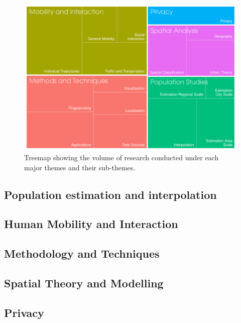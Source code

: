 \begin{figure}
  \includegraphics{images/literature-themes-treemap.png}
  \caption{Treemap showing the volume of research conducted under each major themes and their sub-themes.}
  \label{figure:literature:themes}
\end{figure}

\subsection{Population estimation and interpolation}
\subsection{Human Mobility and Interaction}
\subsection{Methodology and Techniques}
\subsection{Spatial Theory and Modelling}
\subsection{Privacy}

